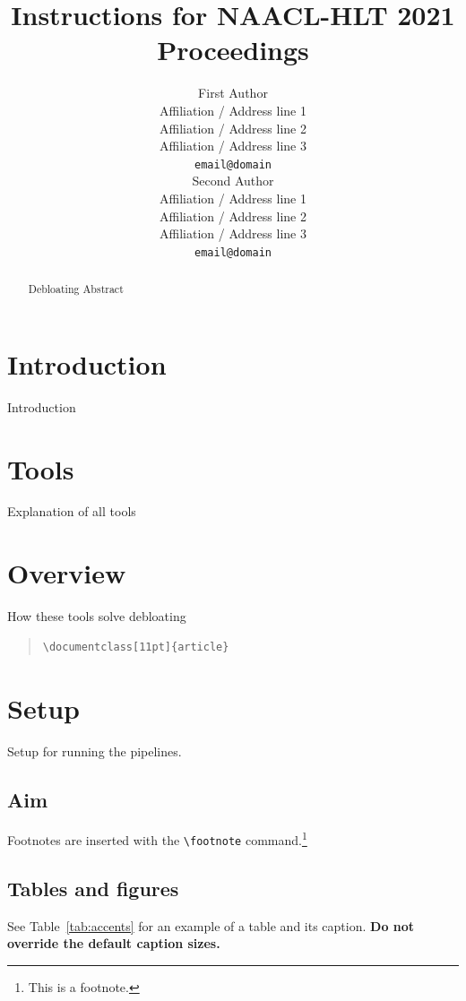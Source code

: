 \documentclass[9pt]{article}
\title{Instructions for NAACL-HLT 2021 Proceedings}
\author{First Author \\
  Affiliation / Address line 1 \\
  Affiliation / Address line 2 \\
  Affiliation / Address line 3 \\
  \texttt{email@domain} \\\And
  Second Author \\
  Affiliation / Address line 1 \\
  Affiliation / Address line 2 \\
  Affiliation / Address line 3 \\
  \texttt{email@domain} \\}
\begin{document}
\maketitle
\begin{abstract}
Debloating Abstract
\end{abstract}

\section{Introduction}
Introduction


\section{Tools}
Explanation of all tools 


\section{Overview}

How these tools solve debloating
\begin{quote}
\begin{verbatim}
\documentclass[11pt]{article}
\end{verbatim}
\end{quote}


\section{Setup}
Setup for running the pipelines. 

\subsection{Aim}
Footnotes are inserted with the \verb|\footnote| command.\footnote{This is a footnote.}

\subsection{Tables and figures}

See Table~\ref{tab:accents} for an example of a table and its caption.
\textbf{Do not override the default caption sizes.}
\end{document}
